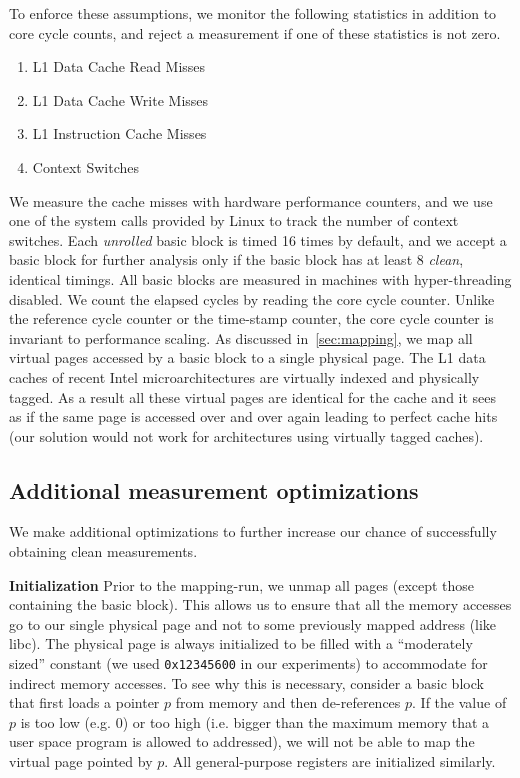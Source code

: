 To enforce these assumptions, we monitor the following statistics in addition to core cycle counts, and reject a measurement if one of these statistics is not zero. 
\begin{enumerate}
    \item L1 Data Cache Read Misses
    \item L1 Data Cache Write Misses
    \item L1 Instruction Cache Misses
    \item Context Switches
\end{enumerate}
We measure the cache misses with hardware performance counters, 
and we use one of the system calls provided by Linux to track the number of context switches. 
Each \textit{unrolled} basic block is timed 16 times by default,
and we accept a basic block for further analysis only if the basic block has at least 
8 \textit{clean}, identical timings.
All basic blocks are measured in machines with hyper-threading disabled.
We count the elapsed cycles by reading the core cycle counter.
Unlike the reference cycle counter or the time-stamp counter, the core cycle counter is invariant
to performance scaling.
As discussed in~\ref{sec:mapping}, we map all virtual pages accessed by 
a basic block to a single physical page.
The L1 data caches of recent Intel microarchitectures are virtually indexed and physically tagged. 
As a result all these virtual pages are identical for the cache and it sees as if the same page is accessed over and over again leading to perfect cache hits 
(our solution would not work for architectures using virtually tagged caches).

\subsection{Additional measurement optimizations}
We make additional optimizations to further increase our chance
of successfully obtaining clean measurements.

\textbf{Initialization} 
Prior to the mapping-run,
we unmap all pages (except those containing the basic block).
This allows us to ensure that all the memory accesses go to our single 
physical page and not to some previously mapped address (like libc).
The physical page is
always initialized to be filled with a “moderately sized” constant
(we used \verb|0x12345600| in our experiments)
to accommodate for indirect memory accesses.
To see why this is necessary,
consider a basic block that first loads a pointer $p$ from memory
and then de-references $p$.
If the value of $p$ is too low (e.g. 0)
or too high
(i.e. bigger than the maximum memory that
a user space program is allowed to addressed),
we will not be able to map the virtual page pointed by $p$.
All general-purpose registers are initialized similarly.

